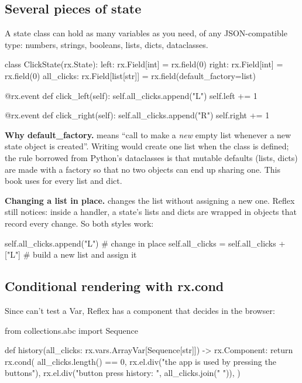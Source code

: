\subsection{Several pieces of state}

A state class can hold as many variables as you need, of any JSON-compatible type: numbers, strings, booleans, lists, dicts, dataclasses.

\begin{py}
class ClickState(rx.State):
	left: rx.Field[int] = rx.field(0)
	right: rx.Field[int] = rx.field(0)
	all_clicks: rx.Field[list[str]] = rx.field(default_factory=list)

	@rx.event
	def click_left(self):
		self.all_clicks.append("L")
		self.left += 1

	@rx.event
	def click_right(self):
		self.all_clicks.append("R")
		self.right += 1
\end{py}

\textbf{Why default\_factory.}  means ``call  to make a \emph{new} empty list whenever a new state object is created''. Writing  would create one list when the class is defined; the rule borrowed from Python's dataclasses is that mutable defaults (lists, dicts) are made with a factory so that no two objects can end up sharing one. This book uses  for every list and dict.

\textbf{Changing a list in place.}  changes the list without assigning a new one. Reflex still notices: inside a handler, a state's lists and dicts are wrapped in objects that record every change. So both styles work:

\begin{py}
self.all_clicks.append("L")                  # change in place
self.all_clicks = self.all_clicks + ["L"]    # build a new list and assign it
\end{py}

\subsection{Conditional rendering with rx.cond}

Since  can't test a Var, Reflex has a component that decides in the browser:

\begin{py}
from collections.abc import Sequence


def history(all_clicks: rx.vars.ArrayVar[Sequence[str]]) -> rx.Component:
	return rx.cond(
		all_clicks.length() == 0,
		rx.el.div("the app is used by pressing the buttons"),
		rx.el.div("button press history: ", all_clicks.join(" ")),
	)
\end{py}

